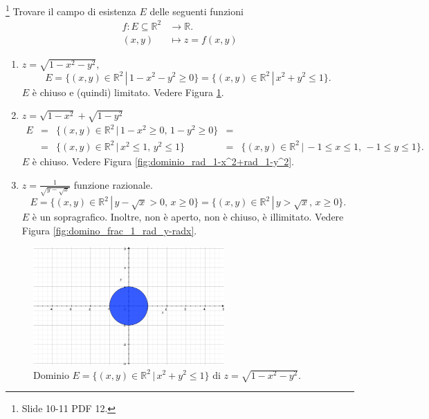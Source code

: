 \begin{example}\footnote{Slide 10-11 PDF 12.}
    Trovare il campo di esistenza $E$ delle seguenti funzioni
    \begin{equation*}
        \begin{aligned}
            f\colon E\subseteq\mathbb R^2 &\rightarrow \mathbb R.\\
            (x,y)&\mapsto z=f(x,y)
        \end{aligned}
    \end{equation*}
    \begin{enumerate}
        \item $z=\sqrt{1-x^2-y^2}$,
        \begin{equation*}
            E=\{(x,y)\in\mathbb R^2\,|\, 1-x^2-y^2\geq 0\}=\{(x,y)\in\mathbb R^2\,|\, x^2+y^2\leq 1\}.
        \end{equation*}
        $E$ è chiuso e (quindi) limitato. Vedere Figura \ref{fig:dominio_rad_1-x^2-y^2}.
        \item $z=\sqrt{1-x^2}+\sqrt{1-y^2}$
        \begin{equation*}
            \begin{matrix}
                E&=&\{(x,y)\in\mathbb R^2\,|\, 1-x^2\geq 0,\, 1-y^2\geq 0\}&=&\\
                &=&\{(x,y)\in\mathbb R^2\,|\, x^2\leq 1,\, y^2\leq 1\}&=&\{(x,y)\in\mathbb R^2\,|\, -1\leq x\leq 1,\, -1\leq y\leq 1\}.
            \end{matrix}
        \end{equation*}
        $E$ è chiuso. Vedere Figura \ref{fig:dominio_rad_1-x^2+rad_1-y^2}.
        \item $z=\frac{1}{\sqrt{y-\sqrt{x}}}$ funzione razionale.
        \begin{equation*}
            E=\{(x,y)\in\mathbb R^2\,|\, y-\sqrt{x}>0,\, x\geq 0\}=\{(x,y)\in\mathbb R^2\,|\, y>\sqrt{x},\, x\geq 0\}.
        \end{equation*}
        $E$ è un sopragrafico. Inoltre, non è aperto, non è chiuso, è illimitato. Vedere Figura \ref{fig:domino_frac_1_rad_y-radx}.
    \end{enumerate}
    \begin{figure}
    \centering
    \includegraphics[width=0.65\textwidth]{Analisi2/figures/dominio_rad_1-x^2-y^2.jpg}
        \caption{Dominio $E=\{(x,y)\in\mathbb R^2\,|\, x^2+y^2\leq 1\}$ di $z=\sqrt{1-x^2-y^2}$.}\label{fig:dominio_rad_1-x^2-y^2}
    \end{figure}
    

\end{example}
